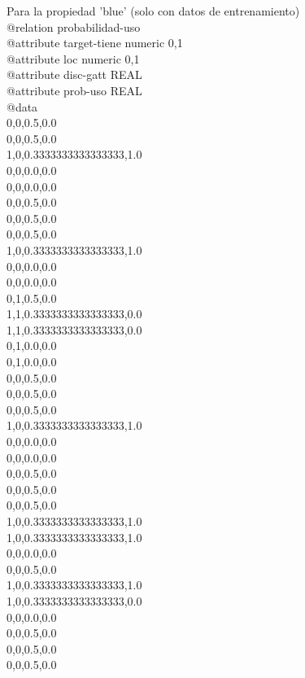 Para la propiedad 'blue' (solo con datos de entrenamiento)\\

@relation probabilidad-uso\\

@attribute target-tiene numeric {0,1}\\
@attribute loc numeric {0,1}\\
@attribute disc-gatt REAL\\
@attribute prob-uso REAL\\

@data\\
0,0,0.5,0.0\\
0,0,0.5,0.0\\
1,0,0.3333333333333333,1.0\\
0,0,0.0,0.0\\
0,0,0.0,0.0\\
0,0,0.5,0.0\\
0,0,0.5,0.0\\
0,0,0.5,0.0\\
1,0,0.3333333333333333,1.0\\
0,0,0.0,0.0\\
0,0,0.0,0.0\\
0,1,0.5,0.0\\
1,1,0.3333333333333333,0.0\\
1,1,0.3333333333333333,0.0\\
0,1,0.0,0.0\\
0,1,0.0,0.0\\
0,0,0.5,0.0\\
0,0,0.5,0.0\\
0,0,0.5,0.0\\
1,0,0.3333333333333333,1.0\\
0,0,0.0,0.0\\
0,0,0.0,0.0\\
0,0,0.5,0.0\\
0,0,0.5,0.0\\
0,0,0.5,0.0\\
1,0,0.3333333333333333,1.0\\
1,0,0.3333333333333333,1.0\\
0,0,0.0,0.0\\
0,0,0.5,0.0\\
1,0,0.3333333333333333,1.0\\
1,0,0.3333333333333333,0.0\\
0,0,0.0,0.0\\
0,0,0.5,0.0\\
0,0,0.5,0.0\\
0,0,0.5,0.0\\
